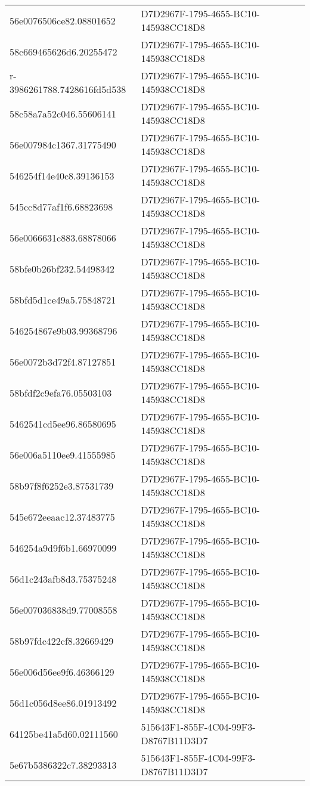 \begin{tabular}{ll}
56e0076506ce82.08801652 & D7D2967F-1795-4655-BC10-145938CC18D8 \\
58c669465626d6.20255472 & D7D2967F-1795-4655-BC10-145938CC18D8 \\
r-3986261788.7428616fd5d538 & D7D2967F-1795-4655-BC10-145938CC18D8 \\
58c58a7a52c046.55606141 & D7D2967F-1795-4655-BC10-145938CC18D8 \\
56e007984c1367.31775490 & D7D2967F-1795-4655-BC10-145938CC18D8 \\
546254f14e40c8.39136153 & D7D2967F-1795-4655-BC10-145938CC18D8 \\
545cc8d77af1f6.68823698 & D7D2967F-1795-4655-BC10-145938CC18D8 \\
56e0066631c883.68878066 & D7D2967F-1795-4655-BC10-145938CC18D8 \\
58bfe0b26bf232.54498342 & D7D2967F-1795-4655-BC10-145938CC18D8 \\
58bfd5d1ce49a5.75848721 & D7D2967F-1795-4655-BC10-145938CC18D8 \\
546254867e9b03.99368796 & D7D2967F-1795-4655-BC10-145938CC18D8 \\
56e0072b3d72f4.87127851 & D7D2967F-1795-4655-BC10-145938CC18D8 \\
58bfdf2c9efa76.05503103 & D7D2967F-1795-4655-BC10-145938CC18D8 \\
5462541cd5ee96.86580695 & D7D2967F-1795-4655-BC10-145938CC18D8 \\
56e006a5110ee9.41555985 & D7D2967F-1795-4655-BC10-145938CC18D8 \\
58b97f8f6252e3.87531739 & D7D2967F-1795-4655-BC10-145938CC18D8 \\
545e672eeaac12.37483775 & D7D2967F-1795-4655-BC10-145938CC18D8 \\
546254a9d9f6b1.66970099 & D7D2967F-1795-4655-BC10-145938CC18D8 \\
56d1c243afb8d3.75375248 & D7D2967F-1795-4655-BC10-145938CC18D8 \\
56e007036838d9.77008558 & D7D2967F-1795-4655-BC10-145938CC18D8 \\
58b97fdc422cf8.32669429 & D7D2967F-1795-4655-BC10-145938CC18D8 \\
56e006d56ee9f6.46366129 & D7D2967F-1795-4655-BC10-145938CC18D8 \\
56d1c056d8ee86.01913492 & D7D2967F-1795-4655-BC10-145938CC18D8 \\
64125be41a5d60.02111560 & 515643F1-855F-4C04-99F3-D8767B11D3D7 \\
5e67b5386322c7.38293313 & 515643F1-855F-4C04-99F3-D8767B11D3D7 \\

\end{tabular}

